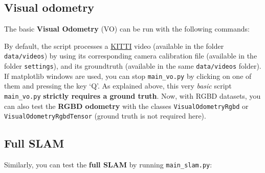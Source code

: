 \documentclass{article}
\newenvironment{Shaded}{\begin{snugshade}}{\end{snugshade}}
\newcommand{\BuiltInTok}[1]{\textcolor[rgb]{0.74,0.68,0.62}{#1}}
\newcommand{\CommentTok}[1]{\textcolor[rgb]{0.00,0.40,1.00}{\textbf{\textit{#1}}}}
\newcommand{\ExtensionTok}[1]{\textcolor[rgb]{0.74,0.68,0.62}{#1}}
\newcommand{\NormalTok}[1]{\textcolor[rgb]{0.74,0.68,0.62}{#1}}
\begin{document}
\hypertarget{visual-odometry}{%
\subsection{Visual odometry}\label{visual-odometry}}

The basic \textbf{Visual Odometry} (VO) can be run with the following
commands:

\begin{scriptsize}
\begin{Shaded}
\end{Shaded}
\end{scriptsize}


By default, the script processes a
\href{http://www.cvlibs.net/datasets/kitti/eval_odometry.php}{KITTI}
video (available in the folder \texttt{data/videos}) by using its
corresponding camera calibration file (available in the folder
\texttt{settings}), and its groundtruth (available in the same
\texttt{data/videos} folder). If matplotlib windows are used, you can
stop \texttt{main\_vo.py} by clicking on one of them and
pressing the key `Q'. As explained above, this very \emph{basic} script
\texttt{main\_vo.py} \textbf{strictly requires a ground truth}. Now,
with RGBD datasets, you can also test the \textbf{RGBD odometry} with
the classes \texttt{VisualOdometryRgbd} or
\texttt{VisualOdometryRgbdTensor} (ground truth is not required here).

\hypertarget{full-slam}{%
\subsection{Full SLAM}\label{full-slam}}

Similarly, you can test the \textbf{full SLAM} by running
\texttt{main\_slam.py}:\\

\begin{scriptsize}
\begin{Shaded}
\end{Shaded}
\end{scriptsize}
\end{document}
